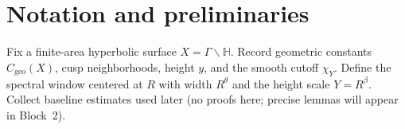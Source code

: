 \section{Notation and preliminaries}\label{sec:prelim}
Fix a finite-area hyperbolic surface $X=\Gamma\backslash\mathbb{H}$.
Record geometric constants $C_{\mathrm{geo}}(X)$, cusp neighborhoods, height $y$, 
and the smooth cutoff $\chi_Y$. Define the spectral window centered at $R$
with width $R^\theta$ and the height scale $Y=R^\beta$. Collect baseline
estimates used later (no proofs here; precise lemmas will appear in Block~2).
